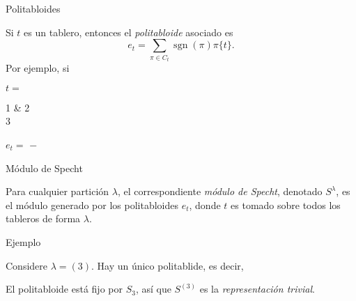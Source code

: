 \documentclass[final,xcolor=svgnames]{beamer}
\DeclareMathOperator{\sgn}{sgn}
\begin{document}
\begin{frame}{}
\begin{columns}
    \begin{column}{0.5\textwidth}
      \begin{block}{Politabloides}
        \begin{scriptsize}
          Si $t$ es un tablero, entonces el \textit{politabloide} asociado es
          $$e_{t}=\sum_{\pi\in C_{t}}\sgn(\pi)\pi\{t\}.$$
          Por ejemplo, si
          \begin{center}$t=$
            \begin{ytableau}
              1 & 2 \\
              3
            \end{ytableau}\quad
            $e_{t}=$
            $-$ 
          \end{center}
        \end{scriptsize}
      \end{block}     
      \begin{block}{Módulo de Specht}
        \begin{scriptsize}
          Para cualquier partición $\lambda$, el correspondiente
          \textit{módulo de Specht}, denotado $S^{\lambda}$, es el
          módulo generado por los politabloides $e_{t}$, donde $t$ es tomado sobre todos los tableros de forma $\lambda$.
        \end{scriptsize}
      \end{block}

      \begin{block}{Ejemplo}
        \begin{scriptsize}
            Considere $\lambda=(3)$. Hay un único politablide, es decir,
            \begin{center}
            \end{center}
            El politabloide está fijo por $S_{3}$, así que $S^{(3)}$ es la
            \textit{representación trivial}.
        

\end{scriptsize}
\end{block}
\end{column}
\end{columns}
\end{frame}
\end{document}

